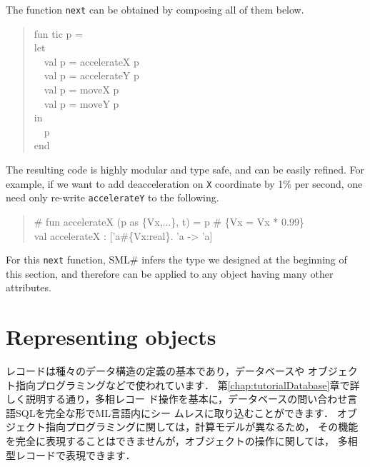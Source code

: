 \documentclass{jbook}
\newif\ifjp
\newcommand{\txt}[2]{#2}
\newcommand{\smlsharp}{SML\#}
\newcommand{\myem}{\mbox{\ \ }}
\begin{document}
	The function {\tt next} can be obtained by composing all of them
below.
\begin{tt}\begin{quote}
fun tic p =\\
let\\
\myem  val p = accelerateX p\\
\myem  val p = accelerateY p\\
\myem  val p = moveX p\\
\myem  val p = moveY p\\
in\\
\myem  p\\
end
\end{quote}\end{tt}
	The resulting code is highly modular and type safe, and can be
easily refined.
	For example, if we want to add deacceleration on {\tt X}
coordinate by 1\% per second, one need only re-write {\tt accelerateY}
to the following.
\begin{tt}\begin{quote}
\# fun accelerateX (p as \{Vx,...\}, t) = p \# \{Vx = Vx * 0.99\}\\
val accelerateX : ['a\#\{Vx:real\}. 'a -> 'a]\\
\end{quote}\end{tt}

	For this {\tt next} function, \smlsharp{} infers the type we 
designed at the beginning of this section, and therefore can be applied
to any object having many other attributes.
\fi%


\section{\txt{オブジェクトの表現}{Representing objects}}
\label{sec:extensionObject}

\ifjp%
	レコードは種々のデータ構造の定義の基本であり，データベースや
オブジェクト指向プログラミングなどで使われています．
	第\ref{chap:tutorialDatabase}章で詳しく説明する通り，多相レコー
ド操作を基本に，データベースの問い合わせ言語SQLを完全な形でML言語内にシー
ムレスに取り込むことができます．
	オブジェクト指向プログラミングに関しては，計算モデルが異なるため，
その機能を完全に表現することはできませんが，オブジェクトの操作に関しては，
多相型レコードで表現できます．
	
\end{document}
